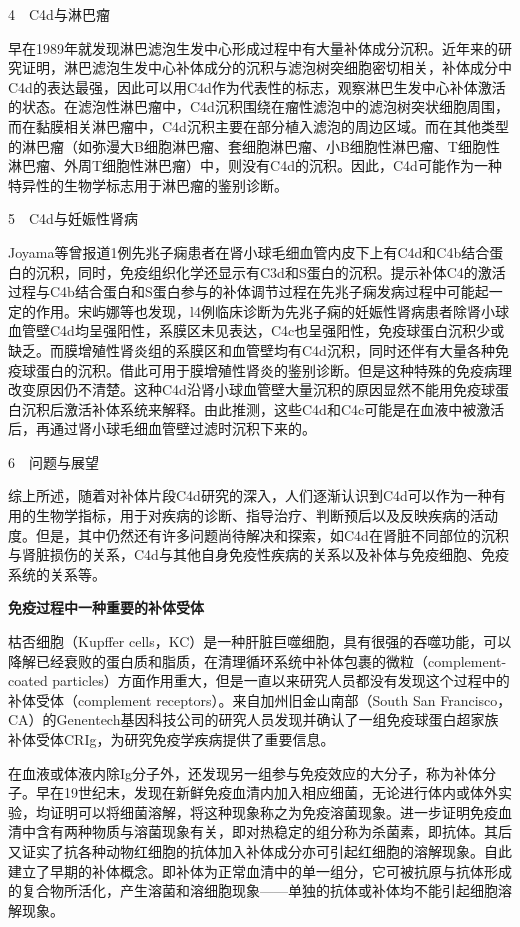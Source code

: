 4　C4d与淋巴瘤

早在1989年就发现淋巴滤泡生发中心形成过程中有大量补体成分沉积。近年来的研究证明，淋巴滤泡生发中心补体成分的沉积与滤泡树突细胞密切相关，补体成分中C4d的表达最强，因此可以用C4d作为代表性的标志，观察淋巴生发中心补体激活的状态。在滤泡性淋巴瘤中，C4d沉积围绕在瘤性滤泡中的滤泡树突状细胞周围，而在黏膜相关淋巴瘤中，C4d沉积主要在部分植入滤泡的周边区域。而在其他类型的淋巴瘤（如弥漫大B细胞淋巴瘤、套细胞淋巴瘤、小B细胞性淋巴瘤、T细胞性淋巴瘤、外周T细胞性淋巴瘤）中，则没有C4d的沉积。因此，C4d可能作为一种特异性的生物学标志用于淋巴瘤的鉴别诊断。

5　C4d与妊娠性肾病

Joyama等曾报道1例先兆子痫患者在肾小球毛细血管内皮下上有C4d和C4b结合蛋白的沉积，同时，免疫组织化学还显示有C3d和S蛋白的沉积。提示补体C4的激活过程与C4b结合蛋白和S蛋白参与的补体调节过程在先兆子痫发病过程中可能起一定的作用。宋屿娜等也发现，l4例临床诊断为先兆子痫的妊娠性肾病患者除肾小球血管壁C4d均呈强阳性，系膜区未见表达，C4c也呈强阳性，免疫球蛋白沉积少或缺乏。而膜增殖性肾炎组的系膜区和血管壁均有C4d沉积，同时还伴有大量各种免疫球蛋白的沉积。借此可用于膜增殖性肾炎的鉴别诊断。但是这种特殊的免疫病理改变原因仍不清楚。这种C4d沿肾小球血管壁大量沉积的原因显然不能用免疫球蛋白沉积后激活补体系统来解释。由此推测，这些C4d和C4c可能是在血液中被激活后，再通过肾小球毛细血管壁过滤时沉积下来的。

6　问题与展望

综上所述，随着对补体片段C4d研究的深入，人们逐渐认识到C4d可以作为一种有用的生物学指标，用于对疾病的诊断、指导治疗、判断预后以及反映疾病的活动度。但是，其中仍然还有许多问题尚待解决和探索，如C4d在肾脏不同部位的沉积与肾脏损伤的关系，C4d与其他自身免疫性疾病的关系以及补体与免疫细胞、免疫系统的关系等。

\begin{center}
  \textbf{\Large 免疫过程中一种重要的补体受体}
\end{center}

枯否细胞（Kupffer
cells，KC）是一种肝脏巨噬细胞，具有很强的吞噬功能，可以降解已经衰败的蛋白质和脂质，在清理循环系统中补体包裹的微粒（complement-coated
particles）方面作用重大，但是一直以来研究人员都没有发现这个过程中的补体受体（complement
receptors）。来自加州旧金山南部（South San
Francisco，CA）的Genentech基因科技公司的研究人员发现并确认了一组免疫球蛋白超家族补体受体CRIg，为研究免疫学疾病提供了重要信息。

在血液或体液内除Ig分子外，还发现另一组参与免疫效应的大分子，称为补体分子。早在19世纪末，发现在新鲜免疫血清内加入相应细菌，无论进行体内或体外实验，均证明可以将细菌溶解，将这种现象称之为免疫溶菌现象。进一步证明免疫血清中含有两种物质与溶菌现象有关，即对热稳定的组分称为杀菌素，即抗体。其后又证实了抗各种动物红细胞的抗体加入补体成分亦可引起红细胞的溶解现象。自此建立了早期的补体概念。即补体为正常血清中的单一组分，它可被抗原与抗体形成的复合物所活化，产生溶菌和溶细胞现象------单独的抗体或补体均不能引起细胞溶解现象。

